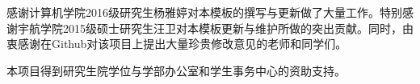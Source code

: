 

\begin{thanks}


感谢计算机学院2016级研究生杨雅婷对本模板的撰写与更新做了大量工作。特别感谢宇航学院2015级硕士研究生汪卫对本模板更新与维护所做的突出贡献。同时，由衷感谢在Github对该项目上提出大量珍贵修改意见的老师和同学们。

本项目得到研究生院学位与学部办公室和学生事务中心的资助支持。

\end{thanks}
